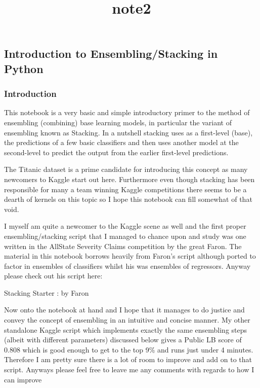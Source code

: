 \documentclass[11pt]{article}
\title{note2}
\begin{document}
    
    
    \maketitle
    
    

    
    \subsection{Introduction to Ensembling/Stacking in
Python}\label{introduction-to-ensemblingstacking-in-python}

\subsubsection{Introduction}\label{introduction}

This notebook is a very basic and simple introductory primer to the
method of ensembling (combining) base learning models, in particular the
variant of ensembling known as Stacking. In a nutshell stacking uses as
a first-level (base), the predictions of a few basic classifiers and
then uses another model at the second-level to predict the output from
the earlier first-level predictions.

The Titanic dataset is a prime candidate for introducing this concept as
many newcomers to Kaggle start out here. Furthermore even though
stacking has been responsible for many a team winning Kaggle
competitions there seems to be a dearth of kernels on this topic so I
hope this notebook can fill somewhat of that void.

I myself am quite a newcomer to the Kaggle scene as well and the first
proper ensembling/stacking script that I managed to chance upon and
study was one written in the AllState Severity Claims competition by the
great Faron. The material in this notebook borrows heavily from Faron's
script although ported to factor in ensembles of classifiers whilst his
was ensembles of regressors. Anyway please check out his script here:

Stacking Starter : by Faron

Now onto the notebook at hand and I hope that it manages to do justice
and convey the concept of ensembling in an intuitive and concise manner.
My other standalone Kaggle script which implements exactly the same
ensembling steps (albeit with different parameters) discussed below
gives a Public LB score of 0.808 which is good enough to get to the top
9\% and runs just under 4 minutes. Therefore I am pretty sure there is a
lot of room to improve and add on to that script. Anyways please feel
free to leave me any comments with regards to how I can improve
\end{document}
